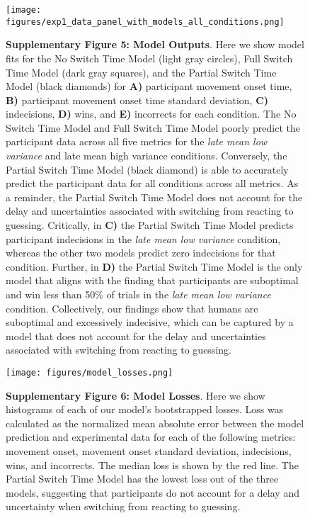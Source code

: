\documentclass[man,floatsintext,letterpaper,12pt]{apa7}
\newcommand\boldblue[1]{\textcolor{mydarkblue}{\textbf{#1}}}
\begin{document}
\begin{figure}[H]
    \begin{minipage}[c]{0.6\textwidth}
        \texttt{[image: figures/exp1\_data\_panel\_with\_models\_all\_conditions.png]}
    \end{minipage}\hfill
    \begin{minipage}[c]{0.3\textwidth}
        \caption*{
            \boldblue{Supplementary Figure 5: Model Outputs}. Here we show model fits for the No Switch Time Model (light gray circles), Full Switch Time Model (dark gray squares), and the Partial Switch Time Model (black diamonds) for \boldblue{A)} participant movement onset time, \boldblue{B)} participant movement onset time standard deviation, \boldblue{C)} indecisions, \boldblue{D)} wins, and \boldblue{E)} incorrects for each condition. The No Switch Time Model and Full Switch Time Model poorly predict the participant data across all five metrics for the \emph{late mean low variance} and late mean high variance conditions. Conversely, the Partial Switch Time Model (black diamond) is able to accurately predict the participant data for all conditions across all metrics. As a reminder, the Partial Switch Time Model does not account for the delay and uncertainties associated with switching from reacting to guessing. Critically, in \boldblue{C)} the Partial Switch Time Model predicts participant indecisions in the \emph{late mean low variance} condition, whereas the other two models predict zero indecisions for that condition. Further, in \boldblue{D)} the Partial Switch Time Model is the only model that aligns with the finding that participants are suboptimal and win less than 50\% of trials in the \emph{late mean low variance} condition. Collectively, our findings show that humans are suboptimal and excessively indecisive, which can be captured by a model that does not account  for the delay and uncertainties associated with switching from reacting to guessing.
        } 
    \end{minipage}
\end{figure}

\begin{figure}[H]
    \centering 
    \texttt{[image: figures/model\_losses.png]}

        \caption*{
            \boldblue{Supplementary Figure 6: Model Losses}. Here we show histograms of each of our model’s bootstrapped losses. Loss was calculated as the normalized mean absolute error between the model prediction and experimental data for each of the following metrics: movement onset, movement onset standard deviation, indecisions, wins, and incorrects. The median loss is shown by the red line. The Partial Switch Time Model has the lowest loss out of the three models, suggesting that participants do not account for a delay and uncertainty when switching from reacting to guessing. 
        } 
\end{figure}
\end{document}
